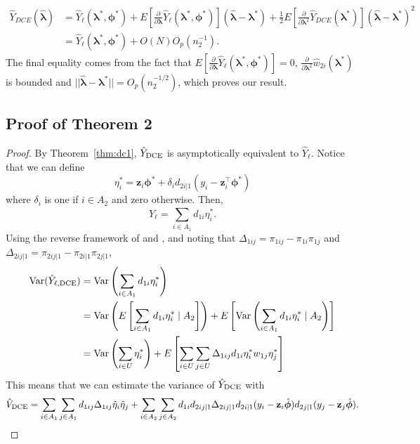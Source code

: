 \documentclass[12pt]{article}
\newcommand{\Var}{{\text{Var}}}
\renewcommand{\bf}[1]{\mathbf{#1}}
\begin{document}
\begin{align*}
  \hat Y_{DCE}(\hat{\bm \lambda}) 
  &= \hat Y_\ell(\bm \lambda^*, \bm \phi^*) + 
  E\left[\frac{\partial}{\partial \bm \lambda}\hat Y_\ell(\bm \lambda^*,
  \bm \phi^*)\right](\hat{\bm \lambda} - \bm \lambda^*) + \frac{1}{2}
  E\left[\frac{\partial}{\partial \bm \lambda^2} \hat Y_{DCE}(\bm \lambda^*)\right] 
  (\hat{\bm \lambda} - \bm \lambda^*)^2\\
  &= \hat Y_\ell(\bm \lambda^*, \bm \phi^*) + O(N)O_p(n_2^{-1}).
\end{align*}
The final equality comes from the fact that 
$E\left[\frac{\partial}{\partial \bm \lambda}
\hat Y_\ell(\bm \lambda^*, \bm \phi^*)\right] = 0$,
$\frac{\partial}{\partial \bm \lambda^2} \hat w_{2i}(\bm \lambda^*)$ is
bounded and $||\hat{\bm \lambda} - \bm \lambda^*|| = O_p(n_2^{-1/2})$, which
proves our result.

\subsection{Proof of Theorem 2}

\begin{proof}
  By Theorem~\ref{thm:dc1}, $\hat Y_{\rm DCE}$ is asymptotically equivalent to
  $\hat Y_{\ell}$. Notice that we can define
  $$
  \eta_i^* = 
  \bf z_i \bm \phi^* + \delta_i d_{2i|1}(y_i - \bf{z}_i^\top \bm \phi^*)
  $$
  where $\delta_i$ is one if $i \in A_2$ and zero otherwise. Then,
  $$
  \hat Y_{\ell} = \sum_{i \in A_1} d_{1i} \eta_i^*.
  $$
  Using the reverse framework of \cite{fay1992inferences} and 
  \cite{shao1999variance}, and noting that 
  $\Delta_{1ij} = \pi_{1ij} - \pi_{1i}\pi_{1j}$ and 
  $\Delta_{2ij|1} = \pi_{2ij|1} - \pi_{2i|1}\pi_{2j|1}$,
  \begin{align*}
    \Var(\hat Y_{\ell, \rm{DCE}}) 
    &= \Var\left(\sum_{i \in A_1} d_{1i} \eta_i^*\right) \\
    &= \Var\left(E\left[\sum_{i \in A_1} d_{1i} \eta_i^* \mid A_2 \right]\right) 
    + E\left[\Var\left(\sum_{i \in A_1} d_{1i} \eta_i^* \mid A_2 \right)\right] \\
    &= \Var\left(\sum_{i \in U} \eta_i^*\right) 
    + E\left[\sum_{i \in U} \sum_{j \in U} \Delta_{1ij} d_{1i} \eta_i^* w_{1j}
      \eta_j^*\right]\\
  \end{align*}
  This means that we can estimate the variance of $\hat Y_{\rm DCE}$ with
  $$
  \hat V_{\rm DCE} 
= \sum_{i \in A_1} \sum_{j \in A_1} d_{1ij} \Delta_{1ij}
  \hat \eta_i \hat \eta_j
+ \sum_{i \in A_2} \sum_{j \in A_2} d_{1i} d_{2ij|1}\Delta_{2ij|1}
  d_{2i|1}(y_i - \bf z_i \hat{\bm \phi})
  d_{2j|1}(y_j - \bf z_j \hat{\bm \phi}).
  $$
\end{proof}
\end{document}
